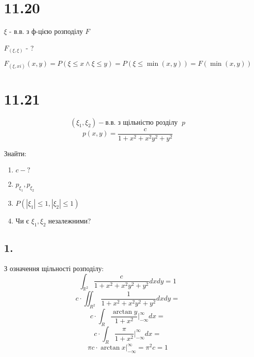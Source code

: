\documentclass[11pt, a4paper]{article} %
\begin{document}




\section*{11.20}
\begin{mdframed}
    $\xi$ - в.в. з ф-цією розподілу $F$

    $F_{(\xi,\xi)}$ - ?
\end{mdframed}

$$F_{(\xi,xi)}(x,y) = P(\xi \le x \wedge \xi \le y) = P(\xi \le \min(x,y)) = F(\min(x,y))$$

\section*{11.21}
\begin{mdframed}
    $$(\xi_1, \xi_2) - \text{в.в. з щільністю розділу } \; p$$
    $$p(x,y) = \frac{c}{1+x^2+x^2y^2+y^2}$$

    Знайти:
    \begin{enumerate}
        \item $c - ?$
        \item $p_{\xi_1}, p_{\xi_2}$
        \item $P(|\xi_1|\le 1, |\xi_2| \le 1)$
        \item Чи є $\xi_1, \xi_2$ незалежними?
    \end{enumerate}
\end{mdframed}

\subsection*{1.}
З означення щільності розподілу:
$$\int_{\mathbb R^2} \frac{c}{1+x^2+x^2y^2+y^2} dxdy = 1$$
$$c \cdot \iint_{R^2} \frac{1}{1+x^2+x^2y^2+y^2} dxdy = $$
$$c \cdot \int_{R} \frac{\arctan y}{1 + x^2} |_{-\infty}^\infty dx = $$
$$c \cdot \int_{R} \frac{\pi}{1 + x^2} |_{-\infty}^\infty dx = $$
$$\pi c \cdot \arctan x |_{-\infty}^\infty = \pi^2 c = 1$$
\end{document}
